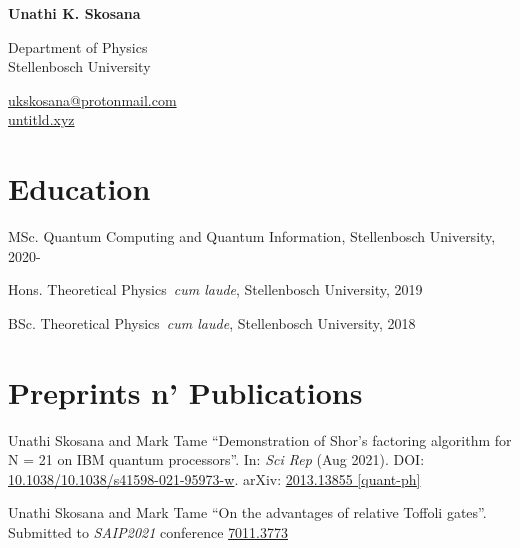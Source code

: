 \documentclass[12pt,letterpaper]{report}
\newcommand{\namefont}[1]{{\normalfont\bfseries\Huge{#1}}}
\newcommand*{\name}{
    Unathi K. Skosana
}
\begin{document}
	\raggedright{}

    \namefont{\name}

    \vspace{1em}
    \begin{minipage}[t]{0.700\textwidth}
        Department of Physics \\
		Stellenbosch University
    \end{minipage}
    \begin{minipage}[t]{0.295\textwidth}
        \flushright{}
        \href{mailto:ukskosana@protonmail.com}{ukskosana@protonmail.com} \\
        \href{https://untitld.xyz}{untitld.xyz}
    \end{minipage}


  \section*{Education}
    \begin{tablist}
        \item[MSc.]  \tab{}Quantum Computing and Quantum Information, Stellenbosch University, 2020-
        \item[Hons.]  \tab{}Theoretical Physics~\textit{cum laude}, Stellenbosch University, 2019
        \item[BSc.]  \tab{}Theoretical Physics~\textit{cum laude}, Stellenbosch University, 2018
    \end{tablist}

	\section*{Preprints n' Publications}
	\begin{tablist}
   \item \tab{}Unathi Skosana and Mark Tame \enquote{Demonstration of Shor’s factoring algorithm for N = 21 on IBM quantum processors}. In: \textit{Sci Rep} (Aug 2021). DOI: \href{https://doi.org/10.1038/s41598-021-95973-w}{10.1038/10.1038/s41598-021-95973-w}. arXiv: \href{https://arxiv.org/abs/2103.13855}{2013.13855 [quant-ph]}
	\item \tab{}Unathi Skosana and Mark Tame \enquote{On the advantages of relative Toffoli gates}. Submitted to \textit{SAIP2021} conference \href{https://events.saip.org.za/event/206/papers/7011/files/3773-on_the_advantages_of_relative_toffoli_gates.pdf}{7011.3773}
	\end{tablist}
\end{document}
